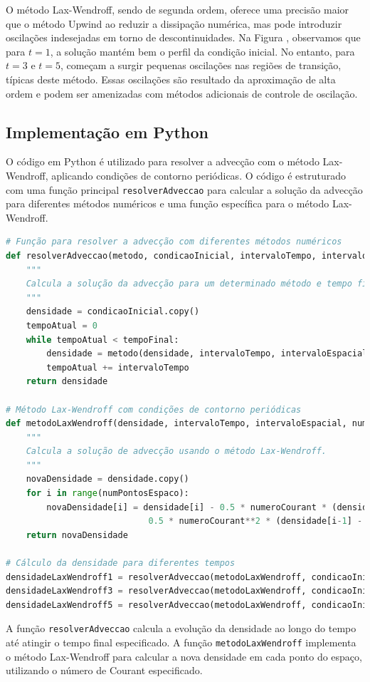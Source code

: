 O método Lax-Wendroff, sendo de segunda ordem, oferece uma precisão maior que o método Upwind ao reduzir a dissipação numérica, mas pode introduzir oscilações indesejadas em torno de descontinuidades. Na Figura , observamos que para \( t=1 \), a solução mantém bem o perfil da condição inicial. No entanto, para \( t=3 \) e \( t=5 \), começam a surgir pequenas oscilações nas regiões de transição, típicas deste método. Essas oscilações são resultado da aproximação de alta ordem e podem ser amenizadas com métodos adicionais de controle de oscilação.

\subsection{Implementação em Python}

O código em Python é utilizado para resolver a advecção com o método Lax-Wendroff, aplicando condições de contorno periódicas. O código é estruturado com uma função principal \texttt{resolverAdveccao} para calcular a solução da advecção para diferentes métodos numéricos e uma função específica para o método Lax-Wendroff.

\begin{lstlisting}[language=Python, caption={Código para resolver a advecção usando o método Lax-Wendroff}, label={lst:codigo_lax_wendroff}]
# Função para resolver a advecção com diferentes métodos numéricos
def resolverAdveccao(metodo, condicaoInicial, intervaloTempo, intervaloEspacial, numeroCourant, tempoFinal):
    """
    Calcula a solução da advecção para um determinado método e tempo final.
    """
    densidade = condicaoInicial.copy()
    tempoAtual = 0
    while tempoAtual < tempoFinal:
        densidade = metodo(densidade, intervaloTempo, intervaloEspacial, numeroCourant)
        tempoAtual += intervaloTempo
    return densidade

# Método Lax-Wendroff com condições de contorno periódicas
def metodoLaxWendroff(densidade, intervaloTempo, intervaloEspacial, numeroCourant):
    """
    Calcula a solução de advecção usando o método Lax-Wendroff.
    """
    novaDensidade = densidade.copy()
    for i in range(numPontosEspaco):
        novaDensidade[i] = densidade[i] - 0.5 * numeroCourant * (densidade[(i+1) \% numPontosEspaco] - densidade[i-1]) + \
                            0.5 * numeroCourant**2 * (densidade[i-1] - 2 * densidade[i] + densidade[(i+1) \% numPontosEspaco])
    return novaDensidade

# Cálculo da densidade para diferentes tempos
densidadeLaxWendroff1 = resolverAdveccao(metodoLaxWendroff, condicaoInicial, intervaloTempo, intervaloEspacial, numeroCourant, tempoFinal1)
densidadeLaxWendroff3 = resolverAdveccao(metodoLaxWendroff, condicaoInicial, intervaloTempo, intervaloEspacial, numeroCourant, tempoFinal3)
densidadeLaxWendroff5 = resolverAdveccao(metodoLaxWendroff, condicaoInicial, intervaloTempo, intervaloEspacial, numeroCourant, tempoFinal5)
\end{lstlisting}

A função \texttt{resolverAdveccao} calcula a evolução da densidade ao longo do tempo até atingir o tempo final especificado. A função \texttt{metodoLaxWendroff} implementa o método Lax-Wendroff para calcular a nova densidade em cada ponto do espaço, utilizando o número de Courant especificado.
